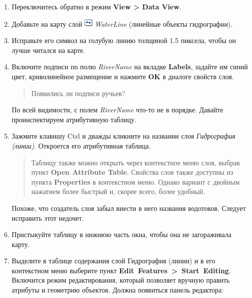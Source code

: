 \documentclass[]{book}
\theoremstyle{definition}
\theoremstyle{definition}
\theoremstyle{definition}
\theoremstyle{remark}
\begin{document}
\begin{enumerate}
\def\labelenumi{\arabic{enumi}.}
\item
  Переключитесь обратно в режим \textbf{View \textgreater{} Data View}.
\item
  Добавьте на карту слой \includegraphics{images/Ex01/image8.png}
  \emph{WaterLine} (линейные объекты гидрографии).
\item
  Исправьте его символ на голубую линию толщиной 1.5 пиксела, чтобы он
  лучше читался на карте.
\item
  Включите подписи по полю \emph{RiverName} на вкладке \textbf{Labels},
  задайте им синий цвет, криволинейное размещение и нажмите \textbf{OK}
  в диалоге свойств слоя.

  \begin{quote}
  Появились ли подписи ручьев?
  \end{quote}

  По всей видимости, с полем \emph{RiverName} что-то не в порядке.
  Давайте проинспектируем атрибутивную таблицу.
\item
  Зажмите клавишу Ctrl и дважды кликните на названии слоя
  \emph{Гидрография (линии)}. Откроется его атрибутивная таблица.

  \begin{quote}
  Таблицу также можно открыть через контекстное меню слоя, выбрав пункт
  \textbf{Open Attribute Table}. Свойства слоя также доступны из пункта
  \textbf{Properties} в контекстном меню. Однако вариант с двойным
  нажатием более быстрый и, скорее всего, более удобный.
  \end{quote}

  Похоже, что создатель слоя забыл внести в него названия водотоков.
  Следует исправить этот недочет.
\item
  Пристыкуйте таблицу в нижнюю часть окна, чтобы она не загораживала
  карту.
\item
  Выделите в таблице содержания слой Гидрография (линии) и в его
  контекстном меню выберите пункт
  \textbf{Edit~Features~\textgreater{}~Start~Editing}. Включится режим
  редактирования, который позволяет вручную править атрибуты и геометрию
  объектов. Должна появиться панель редактора:


\end{enumerate}
\end{document}

